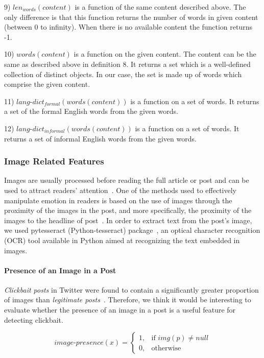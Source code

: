 \documentclass{sig-alternate}
\begin{document}
9) \(len_{words}(content)\) is a function of the same content described above.
The only difference is that this function returns the number of words in given content (between 0 to infinity). 
When there is no available content the function returns -1. 

10) \(words(content)\) is a function on the given content.
The content can be the same as described above in definition 8.
It returns a set which is a well-defined collection of distinct objects. 
In our case, the set is made up of words which comprise the given content.

11) \(lang\text{-}dict_{formal}(words(content))\) is a function on a set of words.
It returns a set of the formal English words from the given words.

12) \(lang\text{-}dict_{informal}(words(content))\) is a function on a set of words.
It returns a set of informal English words from the given words.
   

\subsubsection{Image Related Features}
\label{sec:image_related_features}
Images are usually processed before reading the full article or post and can be used to attract readers’ attention~\cite{ecker2014effects}.
One of the methods used to effectively manipulate emotion in readers is based on the use of images through the proximity of the images in the post, and more specifically, the proximity of the images to the headline of post~\cite{chen2015misleading}.  
In order to extract text from the post's image, we used pytesseract (Python-tesseract) package~\cite{pytesseract}, an optical character recognition (OCR) tool available in Python aimed at recognizing the text embedded in images.


\paragraph{Presence of an Image in a Post}
\emph{Clickbait posts} in Twitter were found to contain a significantly greater proportion of images than \emph{legitimate posts}~\cite{chakraborty2017tabloids}.
Therefore, we think it would be interesting to evaluate whether the presence of an image in a post is a useful feature for detecting clickbait.

	\[
	image\text{-}presence(x)= 
	\begin{cases}
	1,& \text{if } img(p) \neq null \\
	0,              & \text{otherwise}
	\end{cases}
	\]
	
\end{document}
